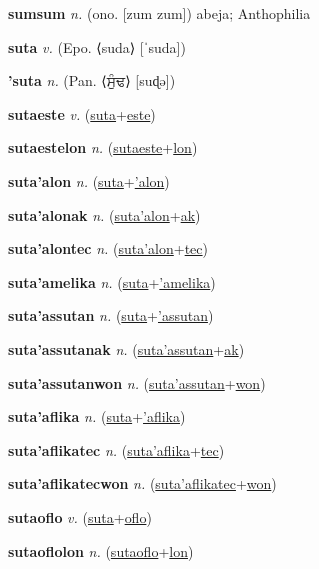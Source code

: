 \textbf{\hypertarget{sumsum}{sumsum}} \textit{n.} (ono. [zum zum])
abeja; Anthophilia

\textbf{\hypertarget{suta}{suta}} \textit{v.} (Epo. ⟨suda⟩ [ˈsuda])


\textbf{\hypertarget{'suta}{'suta}} \textit{n.} (Pan. ⟨{\gurmukhi{}ਸੁੰਢ}⟩ [suɖə])


\textbf{\hypertarget{sutaeste}{sutaeste}} \textit{v.} (\hyperlink{suta}{suta}+\allowbreak \hyperlink{este}{este})


\textbf{\hypertarget{sutaestelon}{sutaestelon}} \textit{n.} (\hyperlink{sutaeste}{sutaeste}+\allowbreak \hyperlink{lon}{lon})


\textbf{\hypertarget{suta'alon}{suta'alon}} \textit{n.} (\hyperlink{suta}{suta}+\allowbreak \hyperlink{'alon}{'alon})


\textbf{\hypertarget{suta'alonak}{suta'alonak}} \textit{n.} (\hyperlink{suta'alon}{suta'alon}+\allowbreak \hyperlink{ak}{ak})


\textbf{\hypertarget{suta'alontec}{suta'alontec}} \textit{n.} (\hyperlink{suta'alon}{suta'alon}+\allowbreak \hyperlink{tec}{tec})


\textbf{\hypertarget{suta'amelika}{suta'amelika}} \textit{n.} (\hyperlink{suta}{suta}+\allowbreak \hyperlink{'amelika}{'amelika})


\textbf{\hypertarget{suta'assutan}{suta'assutan}} \textit{n.} (\hyperlink{suta}{suta}+\allowbreak \hyperlink{'assutan}{'assutan})


\textbf{\hypertarget{suta'assutanak}{suta'assutanak}} \textit{n.} (\hyperlink{suta'assutan}{suta'assutan}+\allowbreak \hyperlink{ak}{ak})


\textbf{\hypertarget{suta'assutanwon}{suta'assutanwon}} \textit{n.} (\hyperlink{suta'assutan}{suta'assutan}+\allowbreak \hyperlink{won}{won})


\textbf{\hypertarget{suta'aflika}{suta'aflika}} \textit{n.} (\hyperlink{suta}{suta}+\allowbreak \hyperlink{'aflika}{'aflika})


\textbf{\hypertarget{suta'aflikatec}{suta'aflikatec}} \textit{n.} (\hyperlink{suta'aflika}{suta'aflika}+\allowbreak \hyperlink{tec}{tec})


\textbf{\hypertarget{suta'aflikatecwon}{suta'aflikatecwon}} \textit{n.} (\hyperlink{suta'aflikatec}{suta'aflikatec}+\allowbreak \hyperlink{won}{won})


\textbf{\hypertarget{sutaoflo}{sutaoflo}} \textit{v.} (\hyperlink{suta}{suta}+\allowbreak \hyperlink{oflo}{oflo})


\textbf{\hypertarget{sutaoflolon}{sutaoflolon}} \textit{n.} (\hyperlink{sutaoflo}{sutaoflo}+\allowbreak \hyperlink{lon}{lon})


